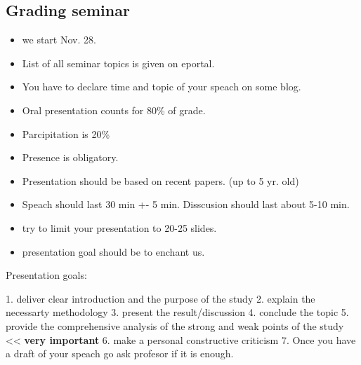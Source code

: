 \documentclass{article}
\begin{document}
\subsection{Grading seminar}
\begin{itemize}

 \item we start Nov. 28.
 \item List of all seminar topics is given on eportal.
 \item You have to declare time and topic of your speach on some blog.
 \item Oral presentation counts for 80\% of grade.
 \item Parcipitation is 20\%
 \item Presence is obligatory.
 \item Presentation should be based on recent papers. (up to 5 yr. old)
 \item Speach should last 30 min +- 5 min. Disscusion should last about 5-10 min.
 \item try to limit your presentation to 20-25 slides.
 \item presentation goal should be to enchant us.

\end{itemize}

Presentation goals:

 1. deliver clear introduction and the purpose of the study
 2. explain the necessarty methodology
 3. present the result/discussion
 4. conclude the topic
 5. provide the comprehensive analysis of the strong and weak points of the study << \textbf{very important}
 6. make a personal constructive criticism
 7. Once you have a draft of your speach go ask profesor if it is enough.
\end{document}
